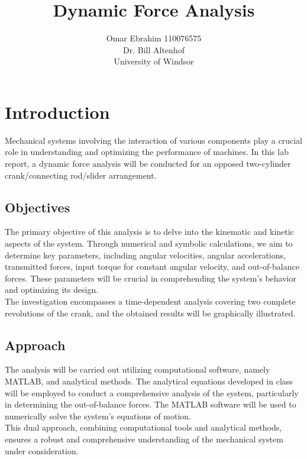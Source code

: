 \documentclass[12pt, titlepage]{article}
\title{Dynamic Force Analysis}
\author{Omar Ebrahim 110076575\\Dr. Bill Altenhof\\ University of Windsor}
\begin{document}
\maketitle
\newpage
\tableofcontents
\listoffigures
\thispagestyle{tocstyle}
\newpage
\section{Introduction}
Mechanical systems involving the interaction of various components play a
crucial role in understanding and optimizing the performance of machines. In
this lab report, a dynamic force analysis will be conducted for an opposed
two-cylinder crank/connecting rod/slider arrangement. 
\subsection{Objectives}
The primary objective of this analysis is to delve into the kinematic and
kinetic aspects of the system. Through numerical and symbolic calculations, we
aim to determine key parameters, including angular velocities, angular
accelerations, transmitted forces, input torque for constant angular velocity,
and out-of-balance forces. These parameters will be crucial in comprehending
the system's behavior and optimizing its design.\\[10pt]
The investigation encompasses a time-dependent analysis covering two complete
revolutions of the crank, and the obtained results will be graphically
illustrated.
\subsection{Approach}
The analysis will be carried out utilizing computational
software, namely MATLAB, and analytical methods. The analytical equations
developed in class will be employed to conduct a comprehensive analysis of the
system, particularly in determining the out-of-balance forces. The MATLAB
software will be used to numerically solve the system's equations of motion.\\[10pt]
This dual approach, combining computational tools and analytical methods,
ensures a robust and comprehensive understanding of the mechanical system under
consideration.
\newpage
\end{document}
